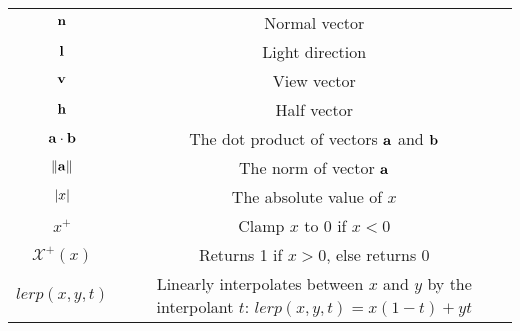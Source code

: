 \begin{appendices}
\begin{center}
	\begin{tabular}{ c c }
		\hline
		\begin{math}\mathbf{n}\end{math} & Normal vector \\
		\begin{math}\mathbf{l}\end{math} & Light direction \\
		\begin{math}\mathbf{v}\end{math} & View vector \\
		\begin{math}\mathbf{h}\end{math} & Half vector \\
		\begin{math}\mathbf{a}\cdot\mathbf{b}\end{math} & The dot product of vectors \begin{math}\mathbf{a}\end{math} and \begin{math}\mathbf{b}\end{math} \\
		\begin{math}\norm{\mathbf{a}}\end{math} & The norm of vector \begin{math}\mathbf{a}\end{math} \\
		\begin{math}\abs{x}\end{math} & The absolute value of \begin{math}x\end{math} \\
		\begin{math}x^+\end{math} & Clamp \begin{math}x\end{math} to \begin{math}0\end{math} if \begin{math}x<0\end{math} \\
		\begin{math}\mathcal{X}^+(x)\end{math} & Returns 1 if \begin{math}x > 0\end{math}, else returns 0 \\
		\begin{math}lerp(x, y, t)\end{math} & Linearly interpolates between \begin{math}x\end{math} and \begin{math}y\end{math} by the interpolant \begin{math}t\end{math}: \begin{math}lerp(x, y, t) = x(1 - t) + yt\end{math} \\

\end{tabular}
\end{center}
\end{appendices}

